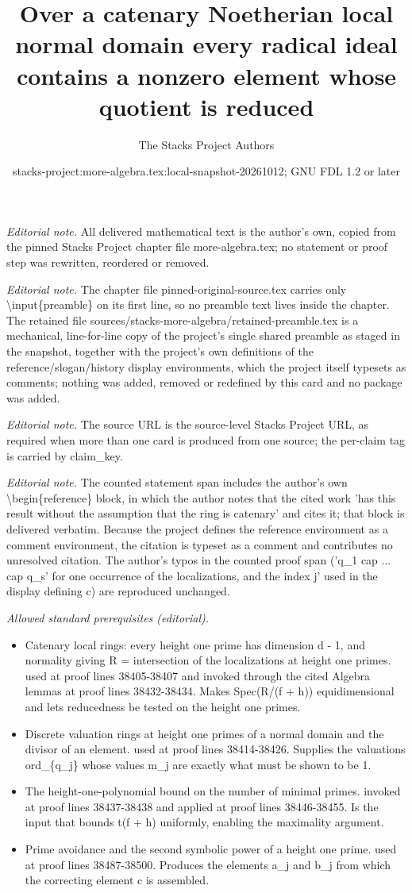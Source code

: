 \documentclass[10pt,a4paper]{amsart}
\title{Over a catenary Noetherian local normal domain every radical ideal contains a nonzero element whose quotient is reduced}
\author{The Stacks Project Authors}
\date{stacks-project:more-algebra.tex:local-snapshot-20261012; GNU FDL 1.2 or later}
\theoremstyle{plain}
\theoremstyle{definition}
\theoremstyle{remark}
\numberwithin{equation}{subsection}
\begin{document}
\maketitle
\setcounter{subsection}{1}
\noindent\textit{Editorial note.} All delivered mathematical text is the author's own, copied from the pinned Stacks Project chapter file more-algebra.tex; no statement or proof step was rewritten, reordered or removed.\par\medskip
\noindent\textit{Editorial note.} The chapter file pinned-original-source.tex carries only \textbackslash{}input\{preamble\} on its first line, so no preamble text lives inside the chapter. The retained file sources/stacks-more-algebra/retained-preamble.tex is a mechanical, line-for-line copy of the project's single shared preamble as staged in the snapshot, together with the project's own definitions of the reference/slogan/history display environments, which the project itself typesets as comments; nothing was added, removed or redefined by this card and no package was added.\par\medskip
\noindent\textit{Editorial note.} The source URL is the source-level Stacks Project URL, as required when more than one card is produced from one source; the per-claim tag is carried by claim\_key.\par\medskip
\noindent\textit{Editorial note.} The counted statement span includes the author's own \textbackslash{}begin\{reference\} block, in which the author notes that the cited work 'has this result without the assumption that the ring is catenary' and cites it; that block is delivered verbatim. Because the project defines the reference environment as a comment environment, the citation is typeset as a comment and contributes no unresolved citation. The author's typos in the counted proof span ('q\_1 cap ... cap q\_s' for one occurrence of the localizations, and the index j' used in the display defining c) are reproduced unchanged.\par\medskip
\noindent\textit{Allowed standard prerequisites (editorial).}\begin{itemize}
\item Catenary local rings: every height one prime has dimension d - 1, and normality giving R = intersection of the localizations at height one primes. used at proof lines 38405-38407 and invoked through the cited Algebra lemmas at proof lines 38432-38434. Makes Spec(R/(f + h)) equidimensional and lets reducedness be tested on the height one primes.
\item Discrete valuation rings at height one primes of a normal domain and the divisor of an element. used at proof lines 38414-38426. Supplies the valuations ord\_\{q\_j\} whose values m\_j are exactly what must be shown to be 1.
\item The height-one-polynomial bound on the number of minimal primes. invoked at proof lines 38437-38438 and applied at proof lines 38446-38455. Is the input that bounds t(f + h) uniformly, enabling the maximality argument.
\item Prime avoidance and the second symbolic power of a height one prime. used at proof lines 38487-38500. Produces the elements a\_j and b\_j from which the correcting element c is assembled.
\end{itemize}\medskip
\end{document}
